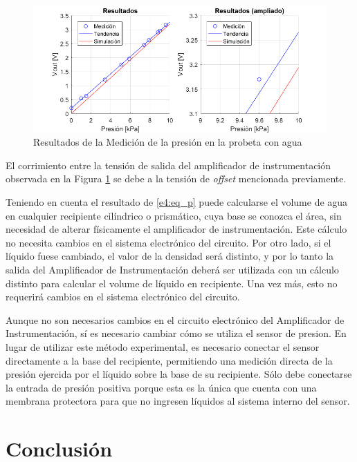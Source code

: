 \begin{figure}
\begin{center}
\includegraphics[scale=0.6]{./res/medysim.png}
\caption{Resultados de la Medición de la presión en la probeta con agua}
\label{e4:fig_p}
\end{center}
\end{figure}

El corrimiento entre la tensión de salida del amplificador de instrumentación observada en la Figura \ref{e4:fig_p} se debe a la tensión de \textit{offset} mencionada previamente.

Teniendo en cuenta el resultado de \eqref{e4:eq_p} puede calcularse el volume de agua en cualquier recipiente cilíndrico o prismático, cuya base se conozca el área, sin necesidad de alterar físicamente el amplificador de instrumentación. Este cálculo no necesita cambios en el sistema electrónico del circuito. Por otro lado, si el líquido fuese cambiado, el valor de la densidad será distinto, y por lo tanto la salida del Amplificador de Instrumentación deberá ser utilizada con un cálculo distinto para calcular el volume de líquido en recipiente. Una vez más, esto no requerirá cambios en el sistema electrónico del circuito.

Aunque no son necesarios cambios en el circuito electrónico del Amplificador de Instrumentación, sí es necesario cambiar cómo se utiliza el sensor de presion. En lugar de utilizar este método experimental, es necesario conectar el sensor directamente a la base del recipiente, permitiendo una medición directa de la presión ejercida por el líquido sobre la base de su recipiente. Sólo debe conectarse la entrada de presión positiva porque esta es la única que cuenta con una membrana protectora para que no ingresen líquidos al sistema interno del sensor.

\section{Conclusión}

